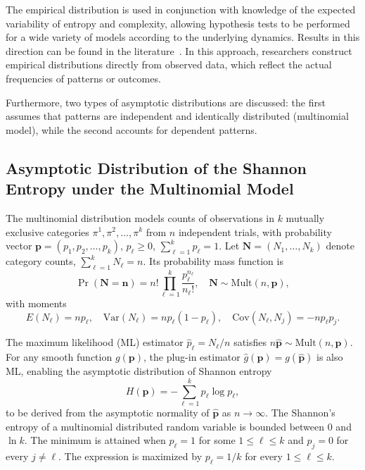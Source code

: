 The empirical distribution is used in conjunction with knowledge of the expected variability of entropy and complexity, allowing hypothesis tests to be performed for a wide variety of models according to the underlying dynamics. Results in this direction can be found in the literature~\cite{Chagas2022a, DeMicco2008, Larrondo2005, Larrondo2006}. In this approach, researchers construct empirical distributions directly from observed data, which reflect the actual frequencies of patterns or outcomes.

Furthermore, two types of asymptotic distributions are discussed: the first assumes that patterns are independent and identically distributed (multinomial model), while the second accounts for dependent patterns.

\subsection {Asymptotic Distribution of the Shannon Entropy under the Multinomial Model}\label{Subsec:Multinomial} 

The multinomial distribution models counts of observations in $k$ mutually exclusive categories $\pi^1,\pi^2,\dots,\pi^k$ from $n$ independent trials, with probability vector $\mathbf{p} = (p_1, p_2, \dots, p_k)$, $p_\ell \ge 0$, $\sum_{\ell=1}^k p_\ell = 1$. Let $\mathbf{N} = (N_1, \dots, N_k)$ denote category counts, $\sum_{\ell=1}^k N_\ell = n$. Its probability mass function is
\[
\Pr(\mathbf{N} = \mathbf{n}) = n! \prod_{\ell=1}^k \frac{p_\ell^{n_\ell}}{n_\ell!}, \quad \mathbf{N} \sim \mathrm{Mult}(n, \mathbf{p}),
\]
with moments
\[
E(N_\ell) = n p_\ell, \quad
\mathrm{Var}(N_\ell) = n p_\ell (1-p_\ell), \quad
\mathrm{Cov}(N_\ell, N_j) = -n p_\ell p_j.
\]

The maximum likelihood (ML) estimator $\widehat{p}_\ell = N_\ell / n$ satisfies $n\widehat{\mathbf{p}} \sim \mathrm{Mult}(n,\mathbf{p})$. For any smooth function $g(\mathbf{p})$, the plug-in estimator $\widehat{g}(\mathbf{p}) = g(\widehat{\mathbf{p}})$ is also ML, enabling the asymptotic distribution of Shannon entropy
\begin{equation}
	H(\mathbf{p}) = -\sum_{\ell=1}^k p_\ell \log p_\ell,
	\label{eq:AsymEntropy}
\end{equation}
to be derived from the asymptotic normality of $\widehat{\mathbf{p}}$ as $n \to \infty$.
The Shannon's entropy of a multinomial distributed random variable is bounded between 0 and $\ln k$. The minimum is attained when $p_{\ell}=1$ for some $1\leq \ell \leq k$ and $p_j=0$ for every $j\ne \ell$. The expression is maximized by $p_{\ell}=1/k$ for every $1\leq \ell \leq k$.  

